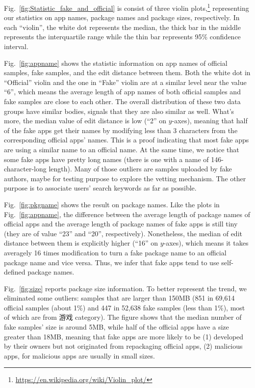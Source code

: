 Fig.~\ref{fig:Statistic_fake_and_official} is consist of three violin plots,\footnote{\url{https://en.wikipedia.org/wiki/Violin_plot/}} representing our statistics on app names, package names and package sizes, respectively.
In each ``violin'', the white dot represents the median, the thick bar in the middle represents the interquartile range while the thin bar represents 95\% confidence interval.

Fig.~\ref{fig:appname} shows the statistic information on app names of official samples, fake samples, and the edit distance between them.
Both the white dot in ``Official'' violin and the one in ``Fake'' violin are at a similar level near the value ``6'', which means the average length of app names of both official samples and fake samples are close to each other.
The overall distribution of these two data groups have similar bodies, signals that they are also similar as well.
What's more, the median value of edit distance is low (``2'' on $y$-axes), meaning that half of the fake apps get their names by modifying less than 3 characters from the corresponding official apps' names.
This is a proof indicating that most fake apps are using a similar name to an official name.
At the same time, we notice that some fake apps have pretty long names (there is one with a name of 146-character-long length).
Many of those outliers are samples uploaded by fake authors, maybe for testing purpose to explore the vetting mechanism. The other purpose is to associate users' search keywords as far as possible.

Fig.~\ref{fig:pkgname} shows the result on package names.
Like the plots in Fig.~\ref{fig:appname}, the difference between the average length of package names of official apps and the average length of package names of fake apps is still tiny (they are of value ``23'' and ``20'', respectively).
Nonetheless, the median of edit distance between them is explicitly higher (``16'' on $y$-axes), which means it takes averagely 16 times modification to turn a fake package name to an official package name and vice versa.
Thus, we infer that fake apps tend to use self-defined package names.

Fig.~\ref{fig:size} reports package size information.
To better represent the trend, we eliminated some outliers: samples that are larger than 150MB (851 in 69,614 official samples (about 1\%) and 447 in 52,638 fake samples (less than 1\%), most of which are from 游戏 category).
The figure shows that the median number of fake samples' size is around 5MB, while half of the official apps have a size greater than 18MB, meaning that fake apps are more likely to be
(1) developed by their owners but not originated from repackaging official apps,
(2) malicious apps, for malicious apps are usually in small sizes.

